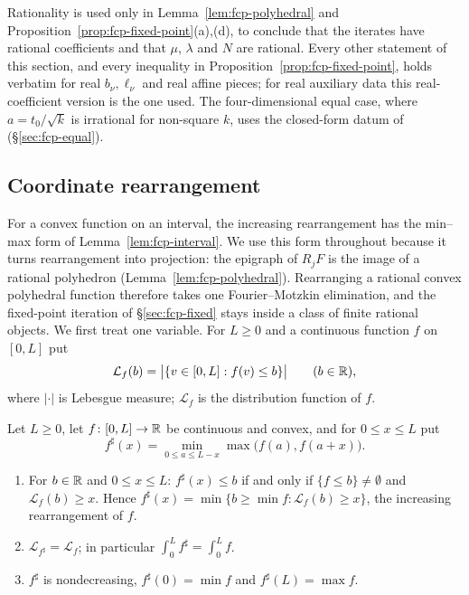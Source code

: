 Rationality is used only in Lemma~\ref{lem:fcp-polyhedral} and Proposition~\ref{prop:fcp-fixed-point}(a),(d), to
conclude that the iterates have rational coefficients and that $\mu$, $\lambda$ and $N$ are rational. Every other
statement of this section, and every inequality in Proposition~\ref{prop:fcp-fixed-point}, holds verbatim for real
$b_\nu,\ell_\nu$ and real affine pieces; for real auxiliary data this real-coefficient version is the one used. The
four-dimensional equal case, where $a=t_0/\sqrt k$ is irrational for non-square $k$, uses the closed-form datum of
 (\S\ref{sec:fcp-equal}).

\subsection{Coordinate rearrangement}\label{sec:fcp-rearrangement}

For a convex function on an interval, the increasing rearrangement has the min--max form of
Lemma~\ref{lem:fcp-interval}. We use this form throughout because it turns rearrangement into projection: the
epigraph of $R_jF$ is the image of a rational polyhedron (Lemma~\ref{lem:fcp-polyhedral}). Rearranging a rational
convex polyhedral function therefore takes one Fourier--Motzkin elimination, and the fixed-point iteration of
\S\ref{sec:fcp-fixed} stays inside a class of finite rational objects. We first treat one variable. For $L\ge0$ and a
continuous function $f$ on $[0,L]$ put
\[
 \mathcal L_f(b)=\bigl|\{v\in[0,L]:f(v)\le b\}\bigr|\qquad(b\in\mathbb{R}),
\]
where $|\cdot|$ is Lebesgue measure; $\mathcal L_f$ is the distribution function of $f$.

\begin{lemma}\label{lem:fcp-interval}
Let $L\ge0$, let $f\colon[0,L]\to\mathbb{R}$ be continuous and convex, and for $0\le x\le L$ put
\[
 f^\sharp(x)=\min_{0\le a\le L-x}\max\bigl(f(a),f(a+x)\bigr).
\]
\begin{enumerate}[label=(\alph*)]
\item For $b\in\mathbb{R}$ and $0\le x\le L$: $f^\sharp(x)\le b$ if and only if $\{f\le b\}\ne\emptyset$ and
 $\mathcal L_f(b)\ge x$. Hence $f^\sharp(x)=\min\{b\ge\min f:\mathcal L_f(b)\ge x\}$, the increasing rearrangement of
 $f$.
\item $\mathcal L_{f^\sharp}=\mathcal L_f$; in particular $\int_0^Lf^\sharp=\int_0^Lf$.
\item $f^\sharp$ is nondecreasing, $f^\sharp(0)=\min f$ and $f^\sharp(L)=\max f$.
\end{enumerate}
\end{lemma}

